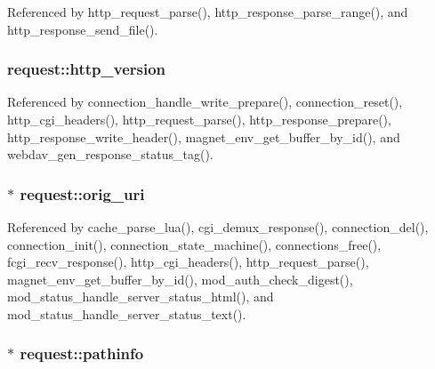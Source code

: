 Referenced by http\-\_\-request\-\_\-parse(), http\-\_\-response\-\_\-parse\-\_\-range(), and http\-\_\-response\-\_\-send\-\_\-file().

\hypertarget{structrequest_a217c1898ea58703de75a50161878c45c}{
\subsubsection[{http\-\_\-version}]{ request\-::http\-\_\-version}}\label{structrequest_a217c1898ea58703de75a50161878c45c}


Referenced by connection\-\_\-handle\-\_\-write\-\_\-prepare(), connection\-\_\-reset(), http\-\_\-cgi\-\_\-headers(), http\-\_\-request\-\_\-parse(), http\-\_\-response\-\_\-prepare(), http\-\_\-response\-\_\-write\-\_\-header(), magnet\-\_\-env\-\_\-get\-\_\-buffer\-\_\-by\-\_\-id(), and webdav\-\_\-gen\-\_\-response\-\_\-status\-\_\-tag().

\hypertarget{structrequest_a519fa85bb594758d61f64c770e4f607f}{
\subsubsection[{orig\-\_\-uri}]{$\ast$ request\-::orig\-\_\-uri}}\label{structrequest_a519fa85bb594758d61f64c770e4f607f}


Referenced by cache\-\_\-parse\-\_\-lua(), cgi\-\_\-demux\-\_\-response(), connection\-\_\-del(), connection\-\_\-init(), connection\-\_\-state\-\_\-machine(), connections\-\_\-free(), fcgi\-\_\-recv\-\_\-response(), http\-\_\-cgi\-\_\-headers(), http\-\_\-request\-\_\-parse(), magnet\-\_\-env\-\_\-get\-\_\-buffer\-\_\-by\-\_\-id(), mod\-\_\-auth\-\_\-check\-\_\-digest(), mod\-\_\-status\-\_\-handle\-\_\-server\-\_\-status\-\_\-html(), and mod\-\_\-status\-\_\-handle\-\_\-server\-\_\-status\-\_\-text().

\hypertarget{structrequest_a09bbfcfb7c8a31ee832fc42b045003d0}{
\subsubsection[{pathinfo}]{$\ast$ request\-::pathinfo}}\label{structrequest_a09bbfcfb7c8a31ee832fc42b045003d0}


